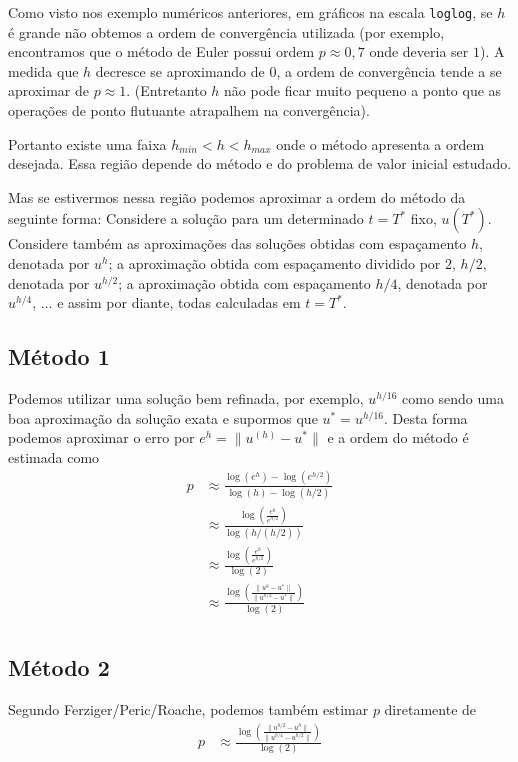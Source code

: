 Como visto nos exemplo numéricos anteriores, em gráficos na escala \verb#loglog#, se $h$ é grande não obtemos a ordem de convergência utilizada (por exemplo, encontramos que o método de Euler possui ordem $p\approx 0,7$ onde deveria ser $1$). A medida que $h$ decresce se aproximando de $0$, a ordem de convergência tende a se aproximar de $p\approx 1$. (Entretanto $h$ não pode ficar muito pequeno a ponto que as operações de ponto flutuante atrapalhem na convergência).

Portanto existe uma faixa $h_{min} < h < h_{max}$ onde o método apresenta a ordem desejada. Essa região depende do método e do problema de valor inicial estudado.

Mas se estivermos nessa região podemos aproximar a ordem do método da seguinte forma: Considere a solução para um determinado $t=T^*$ fixo, $u(T^*)$. Considere também as aproximações das soluções obtidas com espaçamento $h$, denotada por $u^{h}$; a aproximação obtida com espaçamento dividido por $2$, $h/2$, denotada por $u^{h/2}$; a aproximação obtida com espaçamento $h/4$, denotada por $u^{h/4}$, $\ldots $ e assim por diante, todas calculadas em $t=T^*$.

\subsection{Método 1}
Podemos utilizar uma solução bem refinada, por exemplo, $u^{h/16}$ como sendo uma boa aproximação da solução exata e supormos que $u^*=u^{h/16}$. Desta forma podemos aproximar o erro por $e^{h}=\|u^{(h)}-u^*\|$ e a ordem do método é estimada como
\begin{eqnarray}
  p  & \approx  \frac{ \log(e^{h})-\log(e^{h/2})}{\log(h)-\log(h/2)} \\
     & \approx  \frac{ \log \left(   \frac{e^{h}}{e^{h/2}} \right)  }{\log(h /(h/2))} \\
     & \approx  \frac{ \log \left(   \frac{e^{h}}{e^{h/2}} \right)  }{\log(2)} \\
     & \approx  \frac{ \log \left(   \frac{\|u^{h}-u^*\|}{\|u^{h/2}-u^*\|} \right)  }{\log(2)} \\
\end{eqnarray}

\subsection{Método 2}
Segundo Ferziger/Peric/Roache, podemos também estimar $p$ diretamente de
\begin{eqnarray}
  p  & \approx  \frac{ \log \left(   \frac{\|u^{h/2}-u^{h}\|}{\|u^{h/4}-u^{h/2}\|} \right)  }{\log(2)} \\
\end{eqnarray}




